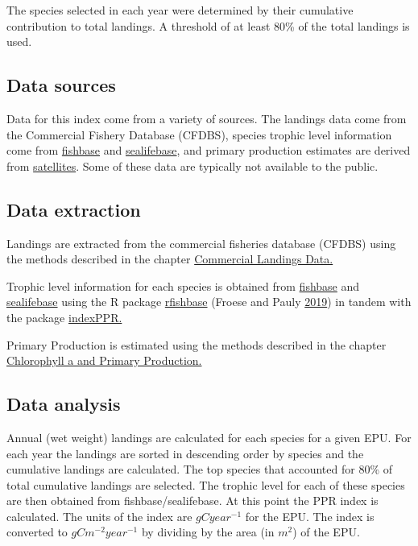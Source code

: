 \documentclass[
]{book}
\begin{document}
The species selected in each year were determined by their cumulative contribution to total landings. A threshold of at least 80\% of the total landings is used.

\hypertarget{data-sources-28}{%
\subsection{Data sources}\label{data-sources-28}}

Data for this index come from a variety of sources. The landings data come from the Commercial Fishery Database (CFDBS), species trophic level information come from \href{http://fishbase.de}{fishbase} and \href{http://sealifebase.ca}{sealifebase}, and primary production estimates are derived from \href{https://noaa-edab.github.io/tech-doc/chl-pp.html}{satellites}. Some of these data are typically not available to the public.

\hypertarget{data-extraction-24}{%
\subsection{Data extraction}\label{data-extraction-24}}

Landings are extracted from the commercial fisheries database (CFDBS) using the methods described in the chapter \href{https://noaa-edab.github.io/tech-doc/comdat.html}{Commercial Landings Data.}

Trophic level information for each species is obtained from \href{http://fishbase.de}{fishbase} and \href{http://sealifebase.ca}{sealifebase} using the R package \href{https://github.com/ropensci/rfishbase}{rfishbase} (Froese and Pauly \protect\hyperlink{ref-froese2019fishbase}{2019}) in tandem with the package \href{https://github.com/andybeet/indexPPR/}{indexPPR.}

Primary Production is estimated using the methods described in the chapter \href{https://noaa-edab.github.io/tech-doc/chl-pp.html}{Chlorophyll a and Primary Production.}

\hypertarget{data-analysis-26}{%
\subsection{Data analysis}\label{data-analysis-26}}

Annual (wet weight) landings are calculated for each species for a given EPU. For each year the landings are sorted in descending order by species and the cumulative landings are calculated. The top species that accounted for 80\% of total cumulative landings are selected. The trophic level for each of these species are then obtained from fishbase/sealifebase. At this point the PPR index is calculated. The units of the index
are \(gCyear^{-1}\) for the EPU. The index is converted to \(gCm^{-2}year^{-1}\) by dividing by the area (in \(m^2\)) of the EPU.
\end{document}
